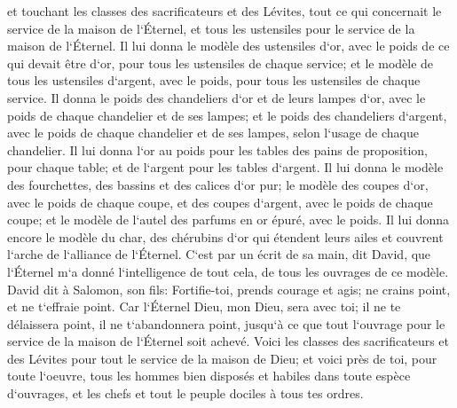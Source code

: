 \verse et touchant les classes des sacrificateurs et des Lévites, tout ce qui concernait le service de la maison de l`Éternel, et tous les ustensiles pour le service de la maison de l`Éternel. 
\verse Il lui donna le modèle des ustensiles d`or, avec le poids de ce qui devait être d`or, pour tous les ustensiles de chaque service; et le modèle de tous les ustensiles d`argent, avec le poids, pour tous les ustensiles de chaque service. 
\verse Il donna le poids des chandeliers d`or et de leurs lampes d`or, avec le poids de chaque chandelier et de ses lampes; et le poids des chandeliers d`argent, avec le poids de chaque chandelier et de ses lampes, selon l`usage de chaque chandelier. 
\verse Il lui donna l`or au poids pour les tables des pains de proposition, pour chaque table; et de l`argent pour les tables d`argent. 
\verse Il lui donna le modèle des fourchettes, des bassins et des calices d`or pur; le modèle des coupes d`or, avec le poids de chaque coupe, et des coupes d`argent, avec le poids de chaque coupe; 
\verse et le modèle de l`autel des parfums en or épuré, avec le poids. Il lui donna encore le modèle du char, des chérubins d`or qui étendent leurs ailes et couvrent l`arche de l`alliance de l`Éternel. 
\verse C`est par un écrit de sa main, dit David, que l`Éternel m`a donné l`intelligence de tout cela, de tous les ouvrages de ce modèle. 
\verse David dit à Salomon, son fils: Fortifie-toi, prends courage et agis; ne crains point, et ne t`effraie point. Car l`Éternel Dieu, mon Dieu, sera avec toi; il ne te délaissera point, il ne t`abandonnera point, jusqu`à ce que tout l`ouvrage pour le service de la maison de l`Éternel soit achevé. 
\verse Voici les classes des sacrificateurs et des Lévites pour tout le service de la maison de Dieu; et voici près de toi, pour toute l`oeuvre, tous les hommes bien disposés et habiles dans toute espèce d`ouvrages, et les chefs et tout le peuple dociles à tous tes ordres. 


